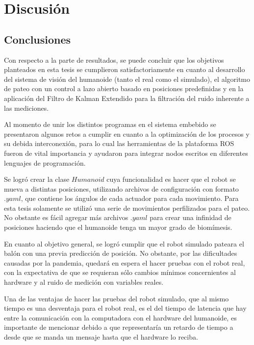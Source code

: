\chapter{Discusión}
\section{Conclusiones}

	Con respecto a la parte de resultados, se puede concluir que los objetivos planteados en esta tesis se cumplieron satisfactoriamente en cuanto al desarrollo del sistema de visión del humanoide (tanto el real como el simulado), el algoritmo de pateo con un control a lazo abierto basado en posiciones predefinidas y en la aplicación del Filtro de Kalman Extendido para la filtración del ruido inherente a las mediciones.

	Al momento de unir los distintos programas en el sistema embebido se presentaron algunos retos a cumplir en cuanto a la optimización de los procesos y su debida interconexión, para lo cual las herramientas de la plataforma ROS fueron de vital importancia y ayudaron para integrar nodos escritos en diferentes lenguajes de programación.

	Se logró crear la clase $Humanoid$ cuya funcionalidad es hacer que el robot se mueva a distintas posiciones, utilizando archivos de configuración con formato $.yaml$, que contiene los ángulos de cada actuador para cada movimiento. Para esta tesis solamente se utilizó una serie de movimientos perfilizados para el pateo. No obstante es fácil agregar más archivos $.yaml$ para crear una infinidad de posiciones haciendo que el humanoide tenga un mayor grado de biomímesis.

	En cuanto al objetivo general, se logró cumplir que el robot simulado pateara el balón con una previa predicción de posición. No obstante, por las dificultades causadas por la pandemia, quedará en espera el hacer pruebas con el robot real, con la expectativa de que se requieran sólo cambios mínimos concernientes al hardware y al ruido de medición con variables reales.
	
	Una de las ventajas de hacer las pruebas del robot simulado, que al mismo tiempo es una desventaja para el robot real, es el del tiempo de latencia que hay entre la comunicación con la computadora con el hardware del humanoide, es importante de mencionar debido a que representaría un retardo de tiempo a desde que se manda un mensaje hasta que el hardware lo reciba. 
	

